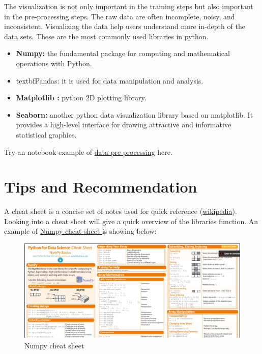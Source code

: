 \documentclass[a4paper,10pt]{article}
\begin{document}
The visualization is not only important in the training steps but also important in the pre-processing steps.\newline
The raw data are often incomplete, noisy, and inconsistent. Visualizing the data help users understand more in-depth of the data sets.\newline
These are the most commonly used libraries in python.

\begin{itemize}
	\item \textbf{Numpy:} the fundamental package for computing and mathematical operations with Python.
	\item textbf{Pandas:} it is used for data manipulation and analysis.
	\item \textbf{Matplotlib :} python 2D plotting library.
	\item \textbf{Seaborn:} another python data visualization library based on matplotlib. It provides a high-level interface for drawing attractive and informative statistical graphics.
\end{itemize}

Try an notebook example of \href{https://www.kaggle.com/trungnguyen0987/data-pre-processing/edit/run/36863946}{data pre processing} here.


\section{Tips and Recommendation}

A cheat sheet is a concise set of notes used for quick reference (\href{https://en.wikipedia.org/wiki/Cheat_sheet}{wikipedia}).\newline
Looking into a cheat sheet will give a quick overview of the libraries function. An example of \href{https://s3.amazonaws.com/assets.datacamp.com/blog_assets/Numpy_Python_Cheat_Sheet.pdf}{Numpy cheat sheet } is showing below:

\begin{figure}[H]
	\centering
	\includegraphics[width=0.8\columnwidth]{Pictures/numpy_cheatsheet.jpg}
	\caption[Short title]{Numpy cheat sheet}
	\label{fig:Numpy.}
	\end{figure}
\end{document}
